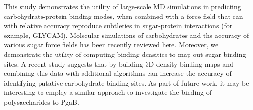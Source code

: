 
This study demonstrates the utility of large-scale MD simulations in predicting carbohydrate-protein binding modes, when combined with a force field that can with relative accuracy reproduce subtleties in sugar-protein interactions (for example, GLYCAM). Molecular simulations of carbohydrates and the accuracy of various sugar force fields has been recently reviewed here.\cite{Fadda:2010p5889}  Moreover, we demonstrate the utility of computing binding densities to map out sugar binding sites. A recent study suggests that by building 3D density binding maps and combining this data with additional algorithms can increase the accuracy of identifying putative carbohydrate binding sites.\cite{Tsai:2012bj} As part of future work, it may be interesting to employ a similar approach to investigate the binding of polysaccharides to PgaB.  





